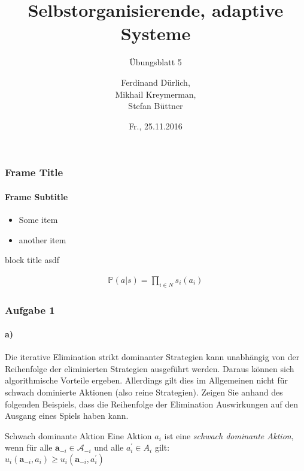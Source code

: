 \documentclass{beamer}
\title[SOAS]{Selbstorganisierende, adaptive Systeme}
\subtitle{Übungsblatt 5}
\author[Ferdinand, Mikhail, Stefan]{ %
Ferdinand Dürlich, \\
Mikhail Kreymerman, \\
Stefan Büttner
}
\institute[ISSE]{ %
Institut for Software \& Systems Engineering\\
Universität Augsburg
}
\date{Fr., 25.11.2016}
\begin{document}
\frame{\titlepage}

\begin{frame}
\frametitle{Frame Title}
\framesubtitle{Frame Subtitle}

\begin{itemize}
    \item Some item
    \item another item
\end{itemize}

\begin{block}{block title}
    asdf
\end{block}
\begin{align*}
    \mathbb{P}(a|s) = \prod_{i \in N} s_i(a_i)
\end{align*}
\end{frame}

\begin{frame}
	\frametitle{Aufgabe 1}
	\framesubtitle{a)}
	Die iterative Elimination strikt dominanter Strategien kann unabhängig von der Reihenfolge
	der eliminierten Strategien ausgeführt werden. Daraus können sich algorithmische Vorteile
	ergeben. Allerdings gilt dies im Allgemeinen nicht für schwach dominierte Aktionen (also reine Strategien). Zeigen Sie anhand des folgenden Beispiels, dass die Reihenfolge der Elimination Auswirkungen auf den Ausgang eines Spiels haben kann.
	
	\begin{block}{Schwach dominante Aktion}
		Eine Aktion $a_i$ ist eine \textit{schwach dominante Aktion}, wenn für alle $\mathbf{a}_{-i} \in \mathcal{A}_{-i}$ und alle $a_i^{'} \in A_i$ gilt:\\
		\centering
		$u_i(\mathbf{a}_{-i}, a_i) \ge u_i(\mathbf{a}_{-i}, a_i^{'})$
	\end{block}
\end{frame}	
\end{document}
